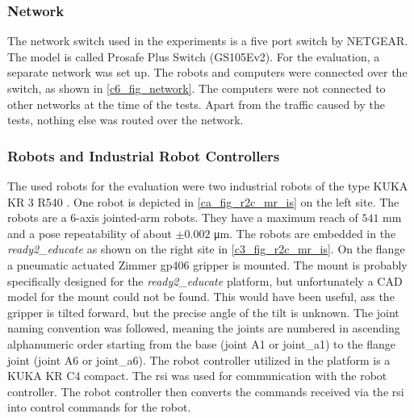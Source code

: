 \subsubsection{Network}\label{c6_sec_network}
The network switch used in the experiments is a five port switch by NETGEAR. The model is called Prosafe Plus Switch (GS105Ev2). For the evaluation, a separate network was set up. The robots and computers were connected over the switch, as shown in \autoref{c6_fig_network}. The computers were not connected to other networks at the time of the tests. Apart from the traffic caused by the tests, nothing else was routed over the network.



\subsubsection{Robots and Industrial Robot Controllers}\label{c3_sec_used_robots}
The used robots for the evaluation were two industrial robots of the type KUKA KR 3 R540 \cite{noauthor_agile_nodate, noauthor_kuka_kr_3_agiluspdf_nodate}. One robot is depicted in \autoref{ca_fig_r2c_mr_is} on the left site. The robots are a 6-axis jointed-arm robots. They have a maximum reach of $541$ \si{\milli\meter} and a pose repeatability of about $\pm 0.002$ \si{\micro\meter}. The robots are embedded in the \textit{ready2\_educate} as shown on the right site in \autoref{c3_fig_r2c_mr_is}. On the flange a pneumatic actuated Zimmer gp406 gripper is mounted. The mount is probably specifically designed for the \textit{ready2\_educate} platform, but unfortunately a CAD model for the mount could not be found. This would have been useful, ass the gripper is tilted forward, but the precise angle of the tilt is unknown. \newline
The joint naming convention was followed, meaning the joints are numbered in ascending alphanumeric order starting from the base (joint A1 or joint\_a1) to the flange joint (joint A6 or joint\_a6).\newline
The robot controller utilized in the platform is a KUKA KR C4 compact. The \acrfull{rsi}  was used for communication with the robot controller. The robot controller then converts the commands received via the \gls{rsi} into control commands for the robot.
